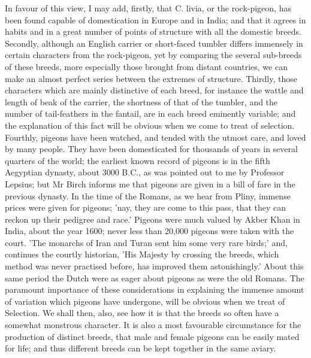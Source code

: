 \indent In favour of this view, I may add, firstly, that C. livia, or the rock-pigeon, has been found capable of domestication in Europe and in India; and that it agrees in habits and in a great number of points of structure with all the domestic breeds. Secondly, although an English carrier or short-faced tumbler differs immensely in certain characters from the rock-pigeon, yet by comparing the several sub-breeds of these breeds, more especially those brought from distant countries, we can make an almost perfect series between the extremes of structure. Thirdly, those characters which are mainly distinctive of each breed, for instance the wattle and length of beak of the carrier, the shortness of that of the tumbler, and the number of tail-feathers in the fantail, are in each breed eminently variable; and the explanation of this fact will be obvious when we come to treat of selection. Fourthly, pigeons have been watched, and tended with the utmost care, and loved by many people. They have been domesticated for thousands of years in several quarters of the world; the earliest known record of pigeons is in the fifth Aegyptian dynasty, about 3000 B.C., as was pointed out to me by Professor Lepsius; but Mr Birch informs me that pigeons are given in a bill of fare in the previous dynasty. In the time of the Romans, as we hear from Pliny, immense prices were given for pigeons; 'nay, they are come to this pass, that they can reckon up their pedigree and race.' Pigeons were much valued by Akber Khan in India, about the year 1600; never less than 20,000 pigeons were taken with the court. 'The monarchs of Iran and Turan sent him some very rare birds;' and, continues the courtly historian, 'His Majesty by crossing the breeds, which method was never practised before, has improved them astonishingly.' About this same period the Dutch were as eager about pigeons as were the old Romans. The paramount importance of these considerations in explaining the immense amount of variation which pigeons have undergone, will be obvious when we treat of Selection. We shall then, also, see how it is that the breeds so often have a somewhat monstrous character. It is also a most favourable circumstance for the production of distinct breeds, that male and female pigeons can be easily mated for life; and thus different breeds can be kept together in the same aviary.  \\
